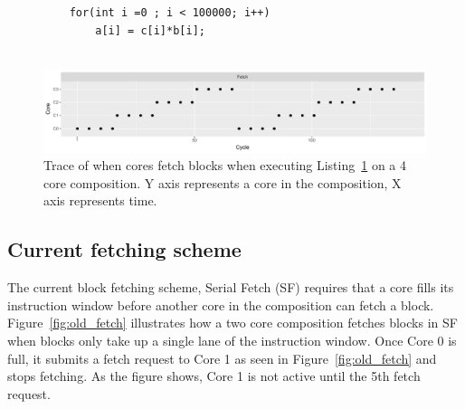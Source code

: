 


\begin{figure}[t]
\lstset{language=C,numbersep=4pt}
\begin{center}
\begin{lstlisting}
	for(int i =0 ; i < 100000; i++)
		a[i] = c[i]*b[i];
	
\end{lstlisting}
\end{center}
\vspace{-1em}
\label{lst:basic}
\vspace{-1em}
\end{figure}

\begin{figure}[t]
    \centering
    \includegraphics[width=1\textwidth]{chapter3/graphics/4fetchnorm2.pdf}
    \caption{Trace of when cores fetch blocks when executing Listing~\ref{lst:basic} on a 4 core composition. Y axis represents a core in the composition, X axis represents time.}
    \label{fig:fetch_norm}
\vspace{1em}
\end{figure}
\subsection{Current fetching scheme}
	
The current block fetching scheme, Serial Fetch (SF) requires that a core fills its instruction window before another core in the composition can fetch a block.
Figure~\ref{fig:old_fetch} illustrates how a two core composition fetches blocks in SF when blocks only take up a single lane of the instruction window.
Once Core 0 is full, it submits a fetch request to Core 1 as seen in Figure~\ref{fig:old_fetch} and stops fetching.
As the figure shows, Core 1 is not active until the 5th fetch request.


